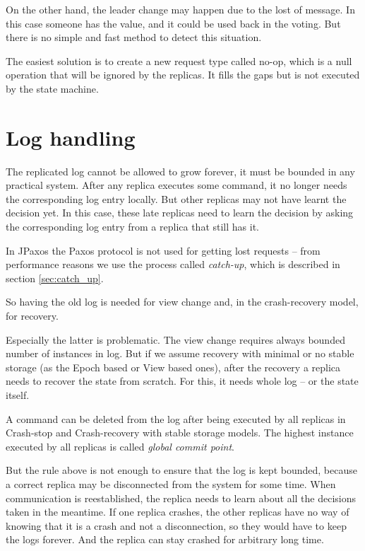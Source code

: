 On the other hand, the leader change may happen due to the lost of \alive message. In this case someone has the value, and it could be used back in the voting. But there is no simple and fast method to detect this situation.

The easiest solution is to create a new request type called no-op, which is a null operation that will be ignored by the replicas. It fills the gaps but is not executed by the state machine.

\section{Log handling}

The replicated log cannot be allowed to grow forever, it must be bounded in any practical system. After any replica executes some command, it no longer needs the corresponding log entry locally. But other replicas may not have learnt the decision yet. In this case, these late replicas need to learn the decision by asking the corresponding log entry from a replica that still has it.

In JPaxos the Paxos protocol is not used for getting lost requests -- from performance reasons we use the process called \textit{catch-up}, which is described in section \ref{sec:catch_up}.

So having the old log is needed for view change and, in the crash-recovery model, for recovery.

Especially the latter is problematic. The view change requires always bounded number of instances in log. But if we assume recovery with minimal or no stable storage (as the Epoch based or View based ones), after the recovery a replica needs to recover the state from scratch. For this, it needs whole log -- or the state itself.


A command can be deleted from the log after being executed by all replicas in Crash-stop and Crash-recovery with stable storage models. The highest instance executed by all replicas is called \emph{global commit point}.

But the rule above is not enough to ensure that the log is kept bounded, because a correct replica may be disconnected from the system for some time. When communication is reestablished, the replica needs to learn about all the decisions taken in the meantime. If one replica crashes, the other replicas have no way of knowing that it is a crash and not a disconnection, so they would have to keep the logs forever. And the replica can stay crashed for arbitrary long time.


